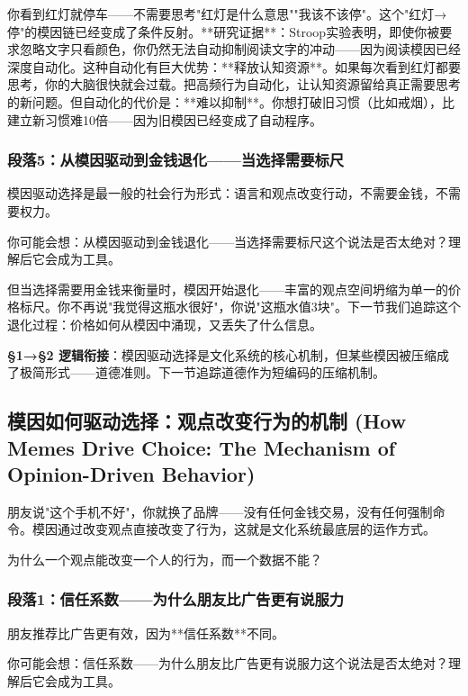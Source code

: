 \documentclass[openany, a4paper, 12pt]{book}
\newenvironment{motivation}{
	\vspace{0.5em}
	\begin{tcolorbox}[
		colback=gray!10,           %
		colframe=gray!60,          %
		title=\textit{本章动机 (Motivation)},
		fonttitle=\bfseries,
		arc=0mm,                   %
		leftrule=3mm               %
		]
		\small \itshape %
	}{
	\end{tcolorbox}
	\vspace{1em}
}
\begin{document}
\begin{motivation}
\begin{motivation}
\begin{motivation}
你看到红灯就停车——不需要思考"红灯是什么意思""我该不该停"。这个"红灯→停"的模因链已经变成了条件反射。**研究证据**：Stroop实验表明，即使你被要求忽略文字只看颜色，你仍然无法自动抑制阅读文字的冲动——因为阅读模因已经深度自动化。这种自动化有巨大优势：**释放认知资源**。如果每次看到红灯都要思考，你的大脑很快就会过载。把高频行为自动化，让认知资源留给真正需要思考的新问题。但自动化的代价是：**难以抑制**。你想打破旧习惯（比如戒烟），比建立新习惯难10倍——因为旧模因已经变成了自动程序。

	\subsubsection*{段落5：从模因驱动到金钱退化——当选择需要标尺}
	模因驱动选择是最一般的社会行为形式：语言和观点改变行动，不需要金钱，不需要权力。
	\begin{tcolorbox}[colback=yellow!5, title=\textit{读者行为预测}]
		你可能会想：从模因驱动到金钱退化——当选择需要标尺这个说法是否太绝对？理解后它会成为工具。
	\end{tcolorbox}

但当选择需要用金钱来衡量时，模因开始退化——丰富的观点空间坍缩为单一的价格标尺。你不再说"我觉得这瓶水很好"，你说"这瓶水值3块"。下一节我们追踪这个退化过程：价格如何从模因中涌现，又丢失了什么信息。

	\textbf{§1→§2 逻辑衔接}：模因驱动选择是文化系统的核心机制，但某些模因被压缩成了极简形式——道德准则。下一节追踪道德作为短编码的压缩机制。

\subsection{模因如何驱动选择：观点改变行为的机制 (How Memes Drive Choice: The Mechanism of Opinion-Driven Behavior)}
\begin{motivation}
	朋友说"这个手机不好"，你就换了品牌——没有任何金钱交易，没有任何强制命令。模因通过改变观点直接改变了行为，这就是文化系统最底层的运作方式。
\end{motivation}
\begin{questionbox}
	为什么一个观点能改变一个人的行为，而一个数据不能？
\end{questionbox}

	\subsubsection*{段落1：信任系数——为什么朋友比广告更有说服力}
朋友推荐比广告更有效，因为**信任系数**不同。
	\begin{tcolorbox}[colback=yellow!5, title=\textit{读者行为预测}]
		你可能会想：信任系数——为什么朋友比广告更有说服力这个说法是否太绝对？理解后它会成为工具。
	\end{tcolorbox}


\end{motivation}
\end{motivation}
\end{motivation}
\end{document}
